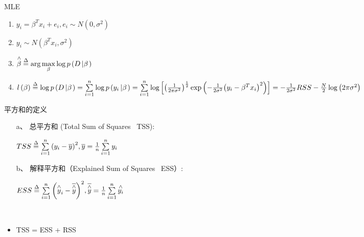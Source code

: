 \documentclass[xetex,mathserif,serif]{beamer}
\begin{document}
\begin{frame}{MLE}
\begin{enumerate}
  \item ${y_i} = {\beta ^T}{x_i} + {e_i},{e_i} \sim N\left( {0,{\sigma ^2}} \right)$
  \item ${y_i} \sim N\left( {{\beta ^T}{x_i},{\sigma ^2}} \right)$
  \item $\mathop \beta \limits^ \wedge   \buildrel \Delta \over = \arg \mathop {\max }\limits_\beta  \log p\left( {D\left| \beta  \right.} \right)$

 \item $l\left( \beta  \right) \buildrel \Delta \over = \log p\left( {D\left| \beta  \right.} \right)
     = \sum\limits_{i = 1}^n {\log p\left( {{y_i}\left| \beta  \right.} \right)}
     = \sum\limits_{i = 1}^n {\log \left[ {{{\left( {\frac{1}{{2\pi {\sigma ^2}}}} \right)}^{\frac{1}{2}}}\exp \left( { - \frac{1}{{2{\sigma ^2}}}{{\left( {{y_i} - {\beta ^T}{x_i}} \right)}^2}} \right)} \right]}
      =  - \frac{1}{{2{\sigma ^2}}}RSS - \frac{N}{2}\log \left( {2\pi {\sigma ^2}} \right)$
\end{enumerate}
\end{frame}

\begin{frame}{平方和的定义}
\begin{itemize}
  \item[a、]总平方和 (Total Sum of Squares \ TSS):
  \begin{center}
    $TSS \buildrel \Delta \over = {\sum\limits_{i = 1}^n {\left( {{y_i} - \overline y } \right)} ^2},\overline y  = \frac{1}{n}\sum\limits_{i = 1}^n {{y_i}} $
  \end{center}
  \item[b、]解释平方和（Explained Sum of Squares \ ESS）:
  \begin{center}
    $ESS{\rm{ }} \buildrel \Delta \over = \sum\limits_{i = 1}^n {{{\left( {{{\mathop {{\rm{ }}y}\limits^ \wedge  }_i} - \overline {\mathop {{\rm{ }}y}\limits^ \wedge  } } \right)}^2}} ,\overline {\mathop {{\rm{ }}y}\limits^ \wedge  }  = \frac{1}{n}\sum\limits_{i = 1}^n {\mathop {{y_i}}\limits^ \wedge  }  $
  \end{center}
\end{itemize}
\\
\begin{itemize}
  \item \textcolor[rgb]{1.00,0.00,0.50}{\Large{TSS = ESS + RSS}}
\end{itemize}
\end{frame}
\end{document}
